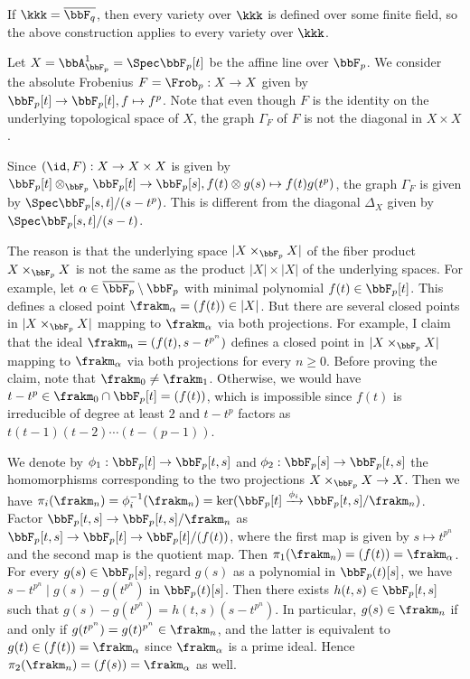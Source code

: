 If $\kkk = \overline{\bbF_q}$, then every variety over $\kkk$ is defined over some finite field, so the above construction applies to every variety over $\kkk$.

\begin{example}
	Let $X = \bbA^1_{\bbF_p} = \Spec \bbF_p[t]$ be the affine line over $\bbF_p$.
	We consider the absolute Frobenius $F = \Frob_p: X \to X$ given by $\bbF_p[t] \to \bbF_p[t], f \mapsto f^p$.
	Note that even though $F$ is the identity on the underlying topological space of $X$, the graph $\Gamma_F$ of $F$ is not the diagonal in $X \times X$.

	Since $(\id,F): X \to X \times X$ is given by $\bbF_p[t] \otimes_{\bbF_p} \bbF_p[t] \to \bbF_p[s], f(t) \otimes g(s) \mapsto f(t) g(t^p)$, the graph $\Gamma_F$ is given by $\Spec \bbF_p[s,t]/(s - t^p)$.
	This is different from the diagonal $\Delta_X$ given by $\Spec \bbF_p[s,t]/(s-t)$.

	The reason is that the underlying space $|X \times_{\bbF_p} X|$ of the fiber product $X \times_{\bbF_p} X$ is not the same as the product $|X| \times |X|$ of the underlying spaces.
	For example, let $\alpha \in \overline{\bbF_p} \setminus \bbF_p$ with minimal polynomial $f(t) \in \bbF_p[t]$.
	This defines a closed point $\frakm_\alpha = (f(t)) \in |X|$.
	But there are several closed points in $|X \times_{\bbF_p} X|$ mapping to $\frakm_\alpha$ via both projections.
	For example, I claim that the ideal $\frakm_n = (f(t), s-t^{p^n})$ defines a closed point in $|X \times_{\bbF_p} X|$ mapping to $\frakm_\alpha$ via both projections for every $n \geq 0$.
	Before proving the claim, note that $\frakm_0 \neq \frakm_1$.
	Otherwise, we would have $t-t^p \in \frakm_0 \cap \bbF_p[t] = (f(t))$, which is impossible since $f(t)$ is irreducible of degree at least $2$ and $t-t^p$ factors as $t(t-1)(t-2) \cdots (t-(p-1))$.

	We denote by $\phi_1: \bbF_p[t] \to \bbF_p[t,s]$ and $\phi_2: \bbF_p[s] \to \bbF_p[t,s]$ the homomorphisms corresponding to the two projections $X \times_{\bbF_p} X \to X$.
	Then we have $\pi_i(\frakm_n) = \phi_i^{-1}(\frakm_n) = \ker(\bbF_p[t] \xrightarrow{\phi_i} \bbF_p[t,s]/\frakm_n)$.
	Factor $\bbF_p[t,s] \to \bbF_p[t,s]/\frakm_n$ as $\bbF_p[t,s] \to \bbF_p[t] \to \bbF_p[t]/(f(t))$, where the first map is given by $s \mapsto t^{p^n}$ and the second map is the quotient map.
	Then $\pi_1(\frakm_n) = (f(t)) = \frakm_\alpha$.
	For every $g(s) \in \bbF_p[s]$, regard $g(s)$ as a polynomial in $\bbF_p(t)[s]$, we have $s-t^{p^n} \mid g(s) - g(t^{p^n})$ in $\bbF_p(t)[s]$.
	Then there exists $h(t,s) \in \bbF_p[t,s]$ such that $g(s) - g(t^{p^n}) = h(t,s)(s-t^{p^n})$.
	In particular, $g(s) \in \frakm_n$ if and only if $g(t^{p^n}) = g(t)^{p^n} \in \frakm_n$, and the latter is equivalent to $g(t) \in (f(t)) = \frakm_\alpha$ since $\frakm_\alpha$ is a prime ideal.
	Hence $\pi_2(\frakm_n) = (f(s)) = \frakm_\alpha$ as well.
\end{example}

